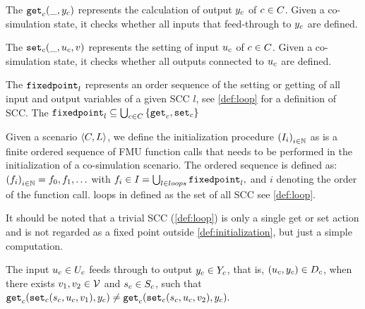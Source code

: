 \begin{definition}\label{def:getout}
The $\mathtt{get}_{c}(\_, y_{c})$ represents the calculation of output $y_{c}$ of $c \in C$. Given a co-simulation state, it checks whether all inputs that feed-through to $y_{c}$ are defined.
\end{definition}

\begin{definition}\label{def:setin}
The $\mathtt{set}_{c}(\_, u_{c}, v)$ represents the setting of input $u_{c}$  of $c \in C$. Given a co-simulation state, it checks whether all outputs connected to $u_{c}$ are defined.
\end{definition}

\begin{definition}\label{def:fixedpoint}
The $\mathtt{fixedpoint}_{l}$ represents an order sequence of the setting or getting of all input and output variables of a given SCC $l$, see \cref{def:loop} for a definition of SCC.
The $\mathtt{fixedpoint}_{l} \subseteq \bigcup_{c \in C}  \left\{ \mathtt{get}_{c},\mathtt{set}_{c} \right\}$ 
\end{definition}


\begin{definition}[Initialization]\label{def:initialization}
  Given a scenario $ \left\langle C, L \right\rangle $, we define the initialization procedure $ \left( I_i \right)_{i \in \mathbb{N}}$ as is a finite ordered sequence of FMU function calls that needs to be performed in the initialization of a co-simulation scenario. The ordered sequence is defined as: $ \left( f_i \right)_{i \in \mathbb{N}} = f_0, f_1, \ldots$ with
  $f_i \in I_{} = \bigcup_{l \in loops} \mathtt{fixedpoint}_{l},$
  and $i$ denoting the order of the function call.
  loops in defined as the set of all SCC see \cref{def:loop}.
\end{definition}

It should be noted that a trivial SCC (\see \cref{def:loop}) is only a single get or set action and is not regarded as a fixed point outside \cref{def:initialization}, but just a simple computation.


\begin{definition}\label{def:feedthrough}
  The input $u_{c} \in U_{c}$ feeds through to output $y_{c} \in Y_{c}$, that is, $(u_{c},y_{c}) \in D_{c}$, when there exists $v_1, v_2 \in \mathcal{V}$ and $s_{c} \in S_{c}$, such that
  $
  \mathtt{get}_{c} (\mathtt{set}_{c}(s_{c}, u_{c}, v_1), y_{c}) \neq \mathtt{get}_{c} (\mathtt{set}_{c}(s_{c}, u_{c}, v_2), y_{c}).
  $
\end{definition}

